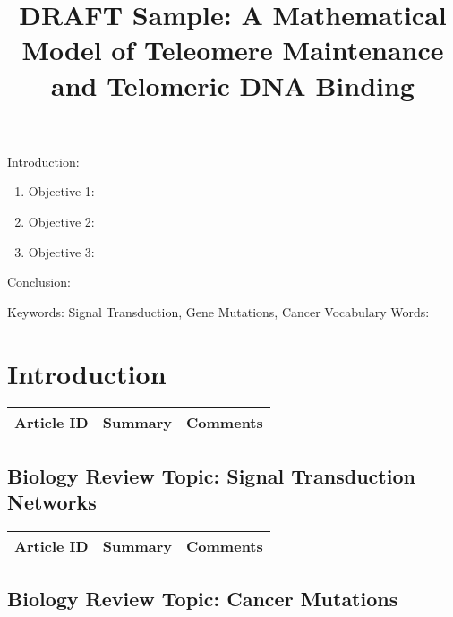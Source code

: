 
\twocolumn
\scriptsize
\begin{frontmatter}
		\title{DRAFT Sample: A Mathematical Model of Teleomere Maintenance and Telomeric DNA Binding }
		\author{}
		\address{The Mathematical Learning Space}
\end{frontmatter}	

Introduction:
\begin{enumerate}
\item Objective 1:
\item Objective 2:
\item Objective 3:
\end{enumerate}
Conclusion:

Keywords: Signal Transduction, Gene Mutations, Cancer
Vocabulary Words:

\section{Introduction}

\begin{table}[H]\centering
	\begin{tabular}{p{1cm}p{4cm}p{3cm}}
		Article ID & Summary & Comments\\
		\hline
		\hline
	\end{tabular}
\end{table}

\subsection{Biology Review Topic: Signal Transduction Networks}

\begin{table}[H]\centering
	\begin{tabular}{p{1cm}p{4cm}p{3cm}}
		Article ID & Summary & Comments\\
		\hline
		\hline
	\end{tabular}
\end{table}

\subsection{Biology Review Topic: Cancer Mutations}

